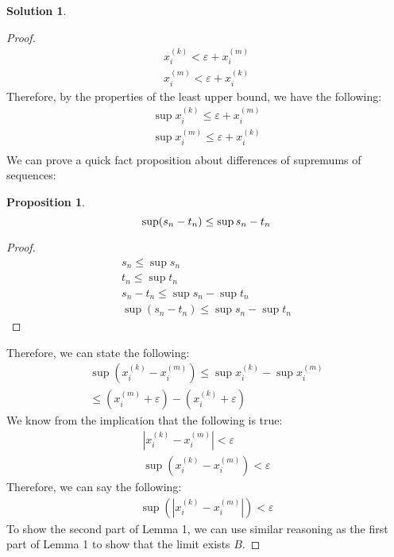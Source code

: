 \documentclass[12pt]{article}
\theoremstyle{definition} %
\newtheorem{solution}{Solution}
\newtheorem*{proposition}{Proposition}
\theoremstyle{plain} %
\begin{document}
\begin{solution}
\begin{proof}
        \begin{align}
            x_{i}^{(k)} <\varepsilon + x_{i}^{(m)} \\[10pt] 
            x_{i}^{(m)} < \varepsilon + x_{i}^{(k)} 
        \end{align}
        Therefore, by the properties of the least upper bound, we have the following:
        \begin{align}
          \sup x_{i}^{(k)} \leq \varepsilon + x_{i}^{(m)}\\[10pt] 
          \sup x_{i}^{(m)} \leq \varepsilon + x_{i}^{(k)}\\[10pt] 
        \end{align}
        We can prove a quick fact proposition about differences of supremums of sequences:
        \begin{proposition}
       $$
          \sup (s_{n} -t_{n} )\leq \sup s_{n} - t_{n} \\[10pt]  
       $$
        \end{proposition}
        \begin{proof}
            \begin{align}
                s_{n} \leq \sup s_{n} \\[10pt] 
                t_{n} \leq \sup t_{n} \\[10pt] 
                s_{n} - t_{n} \leq \sup s_{n} -\sup t_{n} \\[10pt] 
                \sup (s_{n} -t_{n} ) \leq \sup s_{n} -\sup t_{n} 
            \end{align}
        \end{proof}
        Therefore, we can state the following:
        \begin{align}
            \sup (x_{i}^{(k)} -x_{i}^{(m)})\leq \sup x_{i}^{(k)}-\sup x_{i}^{(m)}\\[10pt] 
            \leq (x_{i}^{(m)} +\varepsilon )-(x_{i}^{(k)} +\varepsilon )
        \end{align}
        We know from the implication that the following is true:
        \begin{align} 
            \left\vert x_{i}^{(k)}- x_{i}^{(m)} \right\vert< \varepsilon \\[10pt] 
            \sup (x_{i}^{(k)}-x_{i}^{(m)}    )<\varepsilon 
        \end{align}
        Therefore, we can say the following:
        \begin{align} 
            \sup \left(  \left\vert x_{i}^{(k)}-x_{i}^{(m)} \right\vert\right)      <\varepsilon 
        \end{align}
        To show the second part of Lemma 1, we can use similar reasoning as the first part of Lemma 1 to show that the limit exists $B$.  
    \end{proof}
\end{solution}
\end{document}
